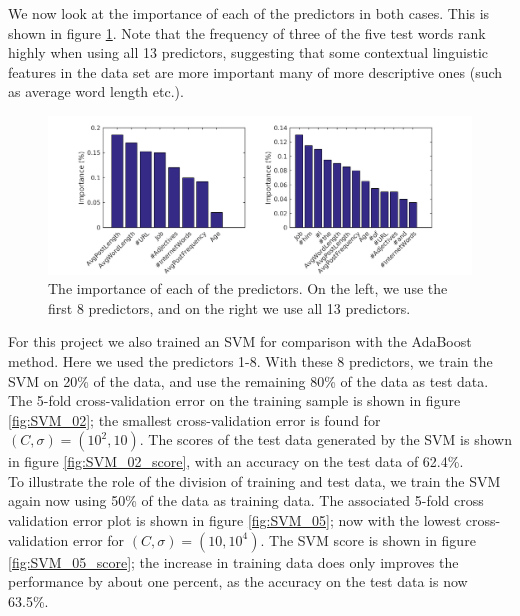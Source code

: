 \documentclass[a4paper,11pt]{article}
\begin{document}
\noindent We now look at the importance of each of the predictors in both cases. This is shown in figure \ref{fig:imprtances}.  Note that the frequency of three of the five test words rank highly when using all 13 predictors, suggesting that some contextual linguistic features in the data set are more important many of more descriptive ones (such as average word length  etc.).\\

\begin{figure}[h!]
    \centerline{\includegraphics[width=1\textwidth]{Pix/ParameterImportance.png}}
    \caption{The importance of each of the predictors. On the left, we use the first 8 predictors, and on the right we use all 13 predictors.}
    \label{fig:imprtances}
\end{figure}
\noindent For this project we also trained an SVM for comparison with the AdaBoost method. Here we used the predictors 1-8.
With these 8 predictors, we train the SVM on 20\% of the data, and use the remaining 80\% of the data as test data. The 5-fold cross-validation error on the training sample is shown in figure \ref{fig:SVM_02}; the smallest cross-validation error is found for $(C,\sigma) = (10^2,10)$. The scores of the test data generated by the SVM is shown in figure \ref{fig:SVM_02_score}, with an accuracy on the test data of 62.4\%.\\

\noindent To illustrate the role of the division of training and test data, we train the SVM again now using 50\% of the data as training data. The associated 5-fold cross validation error plot is shown in figure \ref{fig:SVM_05}; now with the lowest cross-validation error for $(C,\sigma) = (10,10^4)$. The SVM score is shown in figure \ref{fig:SVM_05_score}; the increase in training data does only improves the performance by about one percent, as the accuracy on the test data is now 63.5\%.
\end{document}
